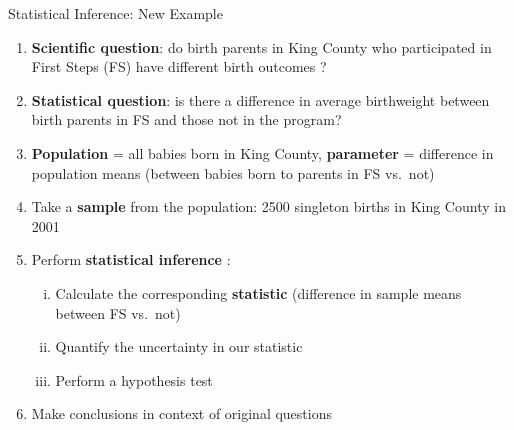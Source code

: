\documentclass[
  ignorenonframetext,
]{beamer}
\providecommand{\tightlist}{%
  \setlength{\itemsep}{0pt}\setlength{\parskip}{0pt}}
\begin{document}
\begin{frame}{Statistical Inference: New Example}
\protect\hypertarget{statistical-inference-new-example-5}{}
\begin{enumerate}
\item
  \textbf{Scientific question}: do birth parents in King County who
  participated in First Steps (FS) have {different }{birth outcomes} ?
\item
  \textbf{Statistical question}: is there a {difference in average}
  {birthweight} between birth parents in FS and those not in the
  program?
\item
  \textbf{Population} = all babies born in King County,
  \textbf{parameter} = difference in population means (between babies
  born to parents in FS vs.~not)
\item
  Take a \textbf{sample} from the population: 2500 singleton births in
  King County in 2001
\item
  Perform \textbf{statistical inference} :

  \begin{enumerate}
  [i.]
  \tightlist
  \item
    Calculate the corresponding \textbf{statistic} (difference in sample
    means between FS vs.~not)
  \item
    Quantify the uncertainty in our statistic
  \item
    Perform a hypothesis test
  \end{enumerate}
\item
  Make conclusions in context of original questions
\end{enumerate}
\end{frame}
\end{document}
